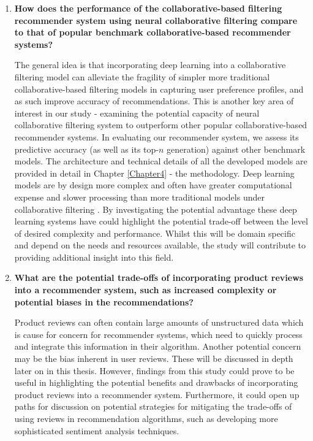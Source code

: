 \begin{enumerate}
    \item \textbf{How does the performance of the collaborative-based filtering recommender system using neural collaborative filtering compare to that of popular benchmark collaborative-based recommender systems?} 
    
    The general idea is that incorporating deep learning into a collaborative filtering model can alleviate the fragility of simpler more traditional collaborative-based filtering models in capturing user preference profiles, and as such improve accuracy of recommendations. This is another key area of interest in our study - examining the potential capacity of neural collaborative filtering system to outperform other popular collaborative-based recommender systems. In evaluating our recommender system, we assess its predictive accuracy (as well as its top-$n$ generation) against other benchmark models. The architecture and technical details of all the developed models are provided in detail in Chapter \ref{Chapter4} - the methodology.  Deep learning models are by design more complex and often have greater computational expense and slower processing than more traditional models under collaborative filtering \cite{he2017neural}. By investigating the potential advantage these deep learning systems have could highlight the potential trade-off between the level of desired complexity and performance. Whilst this will be domain specific and depend on the needs and resources available, the study will contribute to providing additional insight into this field. 
    
    \item \textbf{What are the potential trade-offs of incorporating product reviews into a recommender system, such as increased complexity or potential biases in the recommendations?} 
    
    Product reviews can often contain large amounts of unstructured data which is cause for concern for recommender systems, which need to quickly process and integrate this information in their algorithm. Another potential concern may be the bias inherent in user reviews. These will be discussed in depth later on in this thesis. However, findings from this study could prove to be useful in highlighting the potential benefits and drawbacks of incorporating product reviews into a recommender system. Furthermore, it could open up paths for discussion on potential strategies for mitigating the trade-offs of using reviews in recommendation algorithms, such as developing more sophisticated sentiment analysis techniques. 
\end{enumerate}

